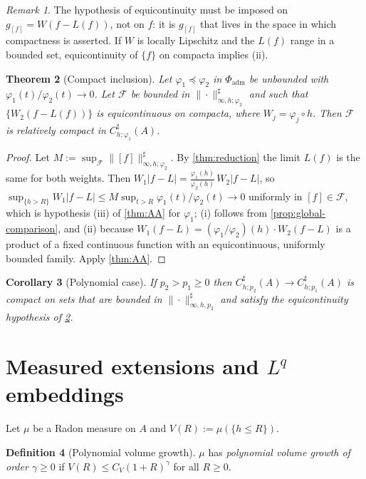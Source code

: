 \documentclass[11pt,a4paper]{article}
\numberwithin{equation}{section}
\theoremstyle{plain}
\newtheorem{theorem}{Theorem}[section]
\newtheorem{corollary}[theorem]{Corollary}
\theoremstyle{definition}
\newtheorem{definition}[theorem]{Definition}
\theoremstyle{remark}
\newtheorem{remark}[theorem]{Remark}
\begin{document}
\begin{remark}
The hypothesis of equicontinuity must be imposed on $g_{[f]}=W(f-L(f))$, not on $f$: it is
$g_{[f]}$ that lives in the space in which compactness is asserted. If $W$ is locally
Lipschitz and the $L(f)$ range in a bounded set, equicontinuity of $\{f\}$ on compacta
implies (ii).
\end{remark}

\begin{theorem}[Compact inclusion]\label{thm:compact-inclusion}
Let $\varphi_1\preceq\varphi_2$ in $\Phi_{\mathrm{adm}}$ be unbounded with
$\varphi_1(t)/\varphi_2(t)\to0$. Let $\mathcal{F}$ be bounded in
$\|\cdot\|^{\sharp}_{\infty,h;\varphi_2}$ and such that
$\{W_2(f-L(f))\}$ is equicontinuous on compacta, where $W_j=\varphi_j\circ h$. Then
$\mathcal{F}$ is relatively compact in $C^{\sharp}_{h;\varphi_1}(A)$.
\end{theorem}

\begin{proof}
Let $M:=\sup_{\mathcal F}\|[f]\|^{\sharp}_{\infty,h;\varphi_2}$. By \cref{thm:reduction}
the limit $L(f)$ is the same for both weights. Then
$W_1|f-L|=\frac{\varphi_1(h)}{\varphi_2(h)}\,W_2|f-L|$, so
$\sup_{\{h>R\}}W_1|f-L|\le M\sup_{t>R}\varphi_1(t)/\varphi_2(t)\to0$ uniformly in
$[f]\in\mathcal F$, which is hypothesis (iii) of \cref{thm:AA} for $\varphi_1$;
(i) follows from \cref{prop:global-comparison}, and (ii) because
$W_1(f-L)=(\varphi_1/\varphi_2)(h)\cdot W_2(f-L)$ is a product of a fixed continuous
function with an equicontinuous, uniformly bounded family. Apply \cref{thm:AA}.
\end{proof}

\begin{corollary}[Polynomial case]\label{cor:compact-poly}
If $p_2>p_1\ge0$ then $C^{\sharp}_{h;p_2}(A)\to C^{\sharp}_{h;p_1}(A)$ is compact on sets
that are bounded in $\|\cdot\|^{\sharp}_{\infty,h,p_2}$ and satisfy the equicontinuity
hypothesis of \cref{thm:compact-inclusion}.
\end{corollary}

\section{Measured extensions and \texorpdfstring{$L^q$}{Lq} embeddings}
\label{sec:Lq}

Let $\mu$ be a Radon measure on $A$ and $V(R):=\mu(\{h\le R\})$.

\begin{definition}[Polynomial volume growth]\label{def:volume}
$\mu$ has \emph{polynomial volume growth of order $\gamma\ge0$} if
$V(R)\le C_V(1+R)^{\gamma}$ for all $R\ge0$.
\end{definition}
\end{document}
